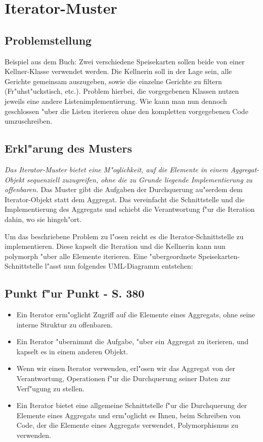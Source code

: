 \section{Iterator-Muster}

\subsection{Problemstellung}
Beispiel aus dem Buch: Zwei verschiedene Speisekarten sollen beide von einer Kellner-Klasse verwendet werden. Die Kellnerin soll in der Lage sein, alle Gerichte gemeinsam auszugeben, sowie die einzelne Gerichte zu filtern (Fr"uhst"uckstisch, etc.). Problem hierbei, die vorgegebenen Klassen nutzen jeweils eine andere Listenimplementierung. Wie kann man nun dennoch geschlossen "uber die Listen iterieren ohne den kompletten vorgegebenen Code umzuschreiben. 

\subsection{Erkl"arung des Musters}
\emph{Das Iterator-Muster bietet eine M"oglichkeit, auf die Elemente in einem Aggregat-Objekt sequenziell zuzugreifen, ohne die zu Grunde liegende Implementierung zu offenbaren.}
Das Muster gibt die Aufgaben der Durchquerung au"serdem dem Iterator-Objekt statt dem Aggregat. Das vereinfacht die Schnittstelle und die Implementierung des Aggregats und schiebt die Verantwortung f"ur die Iteration dahin, wo sie hingeh"ort. 

Um das beschriebene Problem zu l"osen reicht es die Iterator-Schnittstelle zu implementieren. Diese kapselt die Iteration und die Kellnerin kann nun polymorph "uber alle Elemente iterieren. Eine "ubergeordnete Speisekarten-Schnittstelle l"asst nun folgendes UML-Diagramm entstehen: 

\subsection{Punkt f"ur Punkt - S. 380}
\begin{itemize}[leftmargin=0.2in]
	\item Ein Iterator erm"oglicht Zugriff auf die Elemente eines Aggregats, ohne seine interne Struktur zu offenbaren.
	\item Ein Iterator "ubernimmt die Aufgabe, "uber ein Aggregat zu iterieren, und kapselt es in einem anderen Objekt. 
	\item Wenn wir einen Iterator verwenden, erl"osen wir das Aggregat von der Verantwortung, Operationen f"ur die Durchquerung seiner Daten zur Verf"ugung zu stellen.
	\item Ein Iterator bietet eine allgemeine Schnittstelle f"ur die Durchquerung der Elemente eines Aggregats und erm"oglicht es Ihnen, beim Schreiben von Code, der die Elemente eines Aggregats verwendet, Polymorphismus zu verwenden.
\end{itemize}


